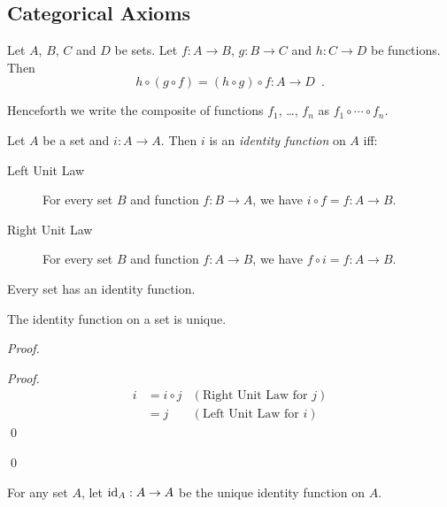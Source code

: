 \subsection{Categorical Axioms}

\begin{ax}[Associativity]
  Let $A$, $B$, $C$ and $D$ be sets. Let $f : A \rightarrow B$, $g : B 
  \rightarrow C$ and $h : C \rightarrow D$ be functions. Then
  \[ h \circ (g \circ f) = (h \circ g) \circ f : A \rightarrow D \enspace . \]
\end{ax}

Henceforth we write the composite of functions $f_1$, \ldots, $f_n$ as $f_1 
\circ \cdots \circ f_n$.

\begin{df}
  Let $A$ be a set and $i : A \rightarrow A$. Then $i$ is an \emph{identity 
    function} on $A$ iff:
  \begin{description}
    \item[Left Unit Law] For every set $B$ and function $f : B \rightarrow A$, 
    we have $i \circ f = f : A \rightarrow B$.
    \item[Right Unit Law] For every set $B$ and function $f : A \rightarrow B$, 
    we have $f \circ i = f : A \rightarrow B$.
  \end{description}
\end{df}

\begin{ax}
  Every set has an identity function.
\end{ax}

\begin{thm}
  The identity function on a set is unique.
\end{thm}

\begin{proof}
  \pf
  \begin{proof}
    \pf
    \begin{align*}
      i & = i \circ j & (\text{Right Unit Law for }j) \\
      & = j & (\text{Left Unit Law for }i)
    \end{align*}
    \qed
  \end{proof}
  \qed
\end{proof}

\begin{df}
  For any set $A$, let $\mathrm{id}_{A} : A \rightarrow A$ be the unique identity 
  function on $A$.
\end{df}

